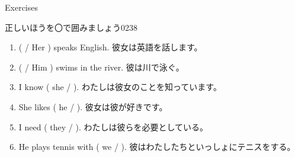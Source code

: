\documentclass[aspectratio=169,xcolor={dvipsnames,table}]{beamer}
\begin{document}
\begin{frame}[plain]{Exercises}

{\small 正しいほうを〇で囲みましょう}\hfill{\tiny 0238}\,{\scriptsize {}}
 \begin{enumerate}
  \item (  / Her ) speaks English. {\small 彼女は英語を話します。}
  \item (   / Him ) swims in the river. {\small 彼は川で泳ぐ。}
  \item  I know ( she /   ). {\small わたしは彼女のことを知っています。}
  \item She likes ( he /   ). {\small 彼女は彼が好きです。}
  \item I need ( they /   ). {\small わたしは彼らを必要としている。}
  \item He plays tennis with ( we /   ). {\small 彼はわたしたちといっしょにテニスをする。}
 \end{enumerate}



\end{frame}
\end{document}
